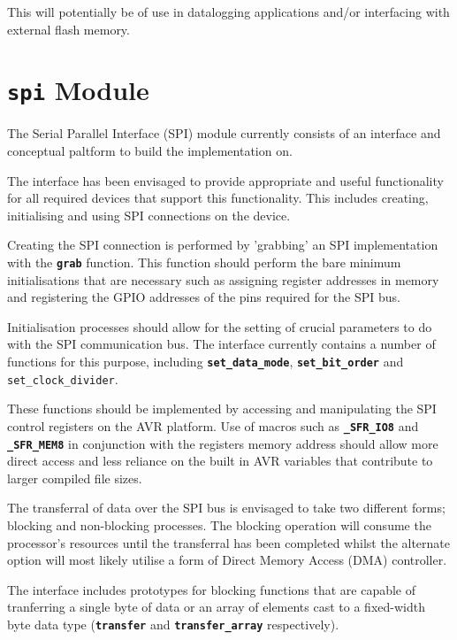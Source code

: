\documentclass[a4paper, oneside, 11pt, titlepage, onecolumn, openright]{report}
\begin{document}
{			This will potentially be of use in datalogging applications and/or interfacing with external flash memory.

\section{\textbf{\texttt{spi}} Module}
			\label{s:HALspiModule}
			
			The Serial Parallel Interface (SPI) module currently consists of an interface and conceptual paltform to build the implementation on.
			
			The interface has been envisaged to provide appropriate and useful functionality for all required devices that support this functionality. This includes creating, initialising and using SPI connections on the device.
			
			Creating the SPI connection is performed by 'grabbing' an SPI implementation with the \textbf{\texttt{grab}} function. This function should perform the bare minimum initialisations that are necessary such as assigning register addresses in memory and registering the GPIO addresses of the pins required for the SPI bus.
			
			Initialisation processes should allow for the setting of crucial parameters to do with the SPI communication bus. The interface currently contains a number of functions for this purpose, including \textbf{\texttt{set\_data\_mode}}, \textbf{\texttt{set\_bit\_order}} and {\texttt{set\_clock\_divider}}.
			
			These functions should be implemented by accessing and manipulating the SPI control registers on the AVR platform. Use of macros such as \textbf{\texttt{\_SFR\_IO8}} and \textbf{\texttt{\_SFR\_MEM8}} in conjunction with the registers memory address should allow more direct access and less reliance on the built in AVR variables that contribute to larger compiled file sizes.
			
			The transferral of data over the SPI bus is envisaged to take two different forms; blocking and non-blocking processes. The blocking operation will consume the processor's resources until the transferral has been completed whilst the alternate option will most likely utilise a form of Direct Memory Access (DMA) controller.
			
			The interface includes prototypes for blocking functions that are capable of tranferring a single byte of data or an array of elements cast to a fixed-width byte data type (\textbf{\texttt{transfer}} and \textbf{\texttt{transfer\_array}} respectively). 
			
}
\end{document}
